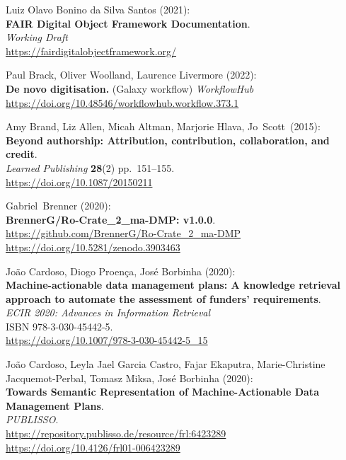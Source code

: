 \begin{thebibliography}{9}
Luiz Olavo Bonino da Silva Santos (2021):\\
\textbf{FAIR Digital Object Framework Documentation}.\\
\emph{Working Draft}\\
\url{https://fairdigitalobjectframework.org/}

Paul Brack, Oliver Woolland, Laurence Livermore
(2022):\\
\textbf{De novo digitisation.} (Galaxy workflow) \emph{WorkflowHub}\\
\url{https://doi.org/10.48546/workflowhub.workflow.373.1}

Amy Brand, Liz Allen, Micah Altman, Marjorie Hlava, Jo~Scott~(2015):\\
\textbf{Beyond authorship: Attribution, contribution, collaboration, and
credit}.\\
\emph{Learned Publishing} \textbf{28}(2) pp.~151--155.\\
\url{https://doi.org/10.1087/20150211}

Gabriel~Brenner (2020):\\
\textbf{BrennerG/Ro-Crate\_2\_ma-DMP: v1.0.0}.\\
\url{https://github.com/BrennerG/Ro-Crate_2_ma-DMP}\\
\url{https://doi.org/10.5281/zenodo.3903463}

João Cardoso, Diogo Proença, José Borbinha (2020):\\
\textbf{Machine-actionable data management plans: A knowledge retrieval
approach to automate the assessment of funders' requirements}.\\
\emph{ECIR 2020: Advances in Information Retrieval}\\
ISBN 978-3-030-45442-5.\\
\url{https://doi.org/10.1007/978-3-030-45442-5_15}

João Cardoso, Leyla Jael Garcia Castro, Fajar Ekaputra, Marie-Christine Jacquemot-Perbal, Tomasz Miksa, José Borbinha (2020):\\
\textbf{Towards Semantic Representation of Machine-Actionable Data
Management Plans}.\\
\emph{PUBLISSO}.\\
\url{https://repository.publisso.de/resource/frl:6423289}\\
\url{https://doi.org/10.4126/frl01-006423289}


\end{thebibliography}
